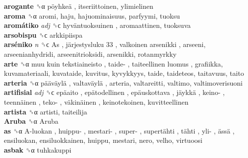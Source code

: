 \textbf{arogante} ␝α   pöyhkeä , itseriittoinen, ylimielinen  \\
\textbf{aroma} ␝α  aromi, haju, hajuominaisuus, parfyymi, tuoksu  \\
\textbf{aromátiko} \emph{adj}  ␝ϲ   hyväntuoksuinen , aromaattinen, tuoksuva  \\
\textbf{arsobispu} ␝ϲ  arkkipiispa  \\
\textbf{arséniko} \emph{n}  ␝ϲ   As ,  järjestysluku 33 ,  valkoinen arsenikki , arseeni, arseenianhydridi, arseenitrioksidi, arsenikki, rotanmyrkky  \\
\textbf{arte} ␝α   muu kuin tekstiaineisto ,  taide- ,  taiteellinen luomus , grafiikka, kuvamateriaali, kuvataide, kuvitus, kyvykkyys, taide, taideteos, taitavuus, taito  \\
\textbf{arteria} ␝α   pääväylä ,  valtaväylä , arteria, valtareitti, valtimo, valtimoverisuoni  \\
\textbf{artifisial} \emph{adj}  ␝ϲ   epäaito ,  epätodellinen ,  epäuskottava ,  jäykkä ,  keino- ,  teennäinen ,  teko- ,  väkinäinen , keinotekoinen, kuvitteellinen  \\
\textbf{artista} ␝α  artisti, taiteilija  \\
\textbf{Aruba} ␝α   Aruba   \\
\textbf{as} ␝α   A-luokan ,  huippu- ,  mestari- ,  super- ,  supertähti ,  tähti ,  yli- ,  ässä , ensiluokan, ensiluokkainen, huippu, mestari, nero, velho, virtuoosi  \\
\textbf{asbak} ␝α  tuhkakuppi  \\
